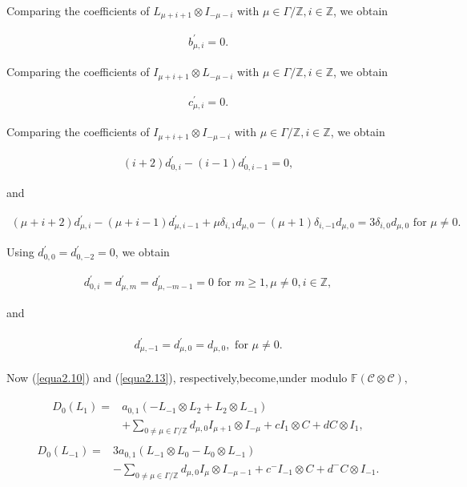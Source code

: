 \documentclass{amsart}
\theoremstyle{definition}
\theoremstyle{remark}
\numberwithin{equation}{subsection}
\numberwithin{equation}{section}
\begin{document}
Comparing the coefficients of $L_{\mu+i+1} \otimes I_{-\mu-i}$  with
$\mu\in \Gamma/\mathbb{Z},i\in \mathbb{Z}$, we obtain

$$\begin{array}{llll}
b^{'}_{\mu,i}=0.
\end{array}$$

Comparing the coefficients of $I_{\mu+i+1} \otimes L_{-\mu-i}$  with
$\mu\in \Gamma/\mathbb{Z},i\in \mathbb{Z}$, we obtain

$$\begin{array}{llll}
c^{'}_{\mu,i}=0.
\end{array}$$

Comparing the coefficients of $I_{\mu+i+1} \otimes I_{-\mu-i}$  with
$\mu\in \Gamma/\mathbb{Z},i\in \mathbb{Z}$, we obtain

$$\begin{array}{llll}
(i+2)d^{'}_{0,i} -(i-1)d^{'}_{0,i-1}=0 ,
\end{array}$$

and

$$\begin{array}{llll}
 (\mu+i+2)d^{'}_{\mu,i}-(\mu+i-1)d^{'}_{\mu,i-1}
+\mu\delta_{i,1}d_{\mu,0}-(\mu+1)\delta_{i,-1}d_{\mu,0}
=3\delta_{i,0}d_{\mu,0} \mbox{ \ for \ } \mu\neq 0.
\end{array}$$

Using $d^{'}_{0,0}=d^{'}_{0,-2}=0$, we obtain

$$\begin{array}{llll}
d^{'}_{0,i}=d^{'}_{\mu,m}=d^{'}_{\mu,-m-1}=0 \mbox{ \ for \ } m\geq
1, \mu\neq 0,i\in\mathbb{Z},
\end{array}$$

and

 \begin{eqnarray}\label{equa2.16}
 \begin{split}
 d^{'}_{\mu,-1}=d^{'}_{\mu,0}=d_{\mu,0}, \mbox{ \ for \ } \mu\neq 0.
\end{split}
\end{eqnarray}

Now (\ref{equa2.10}) and (\ref{equa2.13}), respectively,become,under
modulo $\mathbb{F}(\mathcal {C}\otimes \mathcal {C}),$

\begin{eqnarray}\label{equa2.17}
 \begin{split}
D_0(L_{1})=& a_{0,1}(-L_{-1}\otimes L_2+L_2\otimes L_{-1})
\\& +\underset{0\neq\mu\in
\Gamma/\mathbb{Z}}{\sum}{d_{\mu,0}I_{\mu+1} \otimes I_{-\mu}} +c
I_{1}\otimes C +d C \otimes I_{1},
\end{split}
\end{eqnarray}
\begin{eqnarray}\label{equa2.18}
 \begin{split}
D_0(L_{-1})=& 3a_{0,1}(L_{-1}\otimes L_0-L_0\otimes L_{-1})
\\& -\underset{0\neq\mu\in
\Gamma/\mathbb{Z}}{\sum}{d_{\mu,0}I_\mu \otimes I_{-\mu-1}}
+c^{-}I_{-1}\otimes C +d^{-}C \otimes I_{-1}.
\end{split}
\end{eqnarray}
\end{document}
